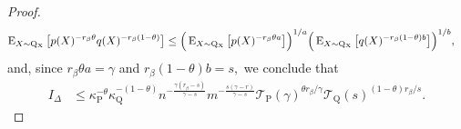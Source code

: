 \documentclass[10pt]{article}
\newcommand{\mT}{\mathcal{T}}
\newcommand{\E}{\operatorname{E}}
\renewcommand{\P}{\operatorname{P}}
\newcommand{\Q}{\operatorname{Q}}
\renewcommand{\k}{\kappa}
\newcommand{\sX}{\mathrm{X}}
\begin{document}
\begin{proof}
    \begin{align*}
        \E_{X \sim \Q\mathstrut_{\!\sX}}\big[p(X)^{-r_\beta \theta}q(X)^{-r_\beta(1 - \theta)}\big] &\leq \Big(\E_{X \sim \Q\mathstrut_{\!\sX}}\big[p(X)^{-r_\beta \theta a}\big]\Big)^{1/a}\Big(\E_{X \sim \Q\mathstrut_{\!\sX}}\big[q(X)^{-r_\beta(1 - \theta)b}\big]\Big)^{1/b},
    \end{align*}
    and, since $r_\beta\theta a = \gamma$ and $r_\beta(1 - \theta)b = s,$ we conclude that
    \begin{align*}
        I_{\Delta} &\leq \k_{\P}^{-\theta}\k_{\Q}^{-(1 - \theta)}n^{-\tfrac{\gamma(r_\beta - s)}{\gamma - s}}m^{-\tfrac{s(\gamma - r)}{\gamma - s}}\mT_{\P}(\gamma)^{\theta r_\beta/\gamma} \mT_{\Q}(s)^{(1 - \theta)r_\beta/s}.
    \end{align*}
    

\end{proof}
\end{document}
